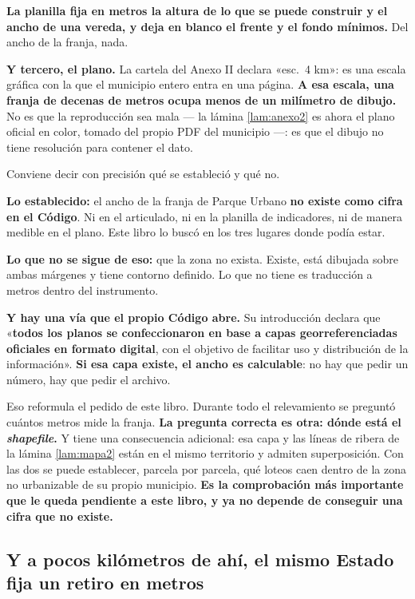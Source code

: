 \textbf{La planilla fija en metros la altura de lo que se puede construir y el ancho de una
vereda, y deja en blanco el frente y el fondo mínimos.} Del ancho de la franja, nada.

\textbf{Y tercero, el plano.} La cartela del Anexo II declara «esc.\ 4 km»: es una escala
gráfica con la que el municipio entero entra en una página. \textbf{A esa escala, una franja
de decenas de metros ocupa menos de un milímetro de dibujo.} No es que la reproducción sea
mala --- la lámina \ref{lam:anexo2} es ahora el plano oficial en color, tomado del propio PDF
del municipio ---: es que el dibujo no tiene resolución para contener el dato.

\begin{cautela}
Conviene decir con precisión qué se estableció y qué no.

\textbf{Lo establecido:} el ancho de la franja de Parque Urbano \textbf{no existe como cifra
en el Código}. Ni en el articulado, ni en la planilla de indicadores, ni de manera medible en
el plano. Este libro lo buscó en los tres lugares donde podía estar.

\textbf{Lo que no se sigue de eso:} que la zona no exista. Existe, está dibujada sobre ambas
márgenes y tiene contorno definido. Lo que no tiene es traducción a metros dentro del
instrumento.

\textbf{Y hay una vía que el propio Código abre.} Su introducción declara que «\textbf{todos
los planos se confeccionaron en base a capas georreferenciadas oficiales en formato digital},
con el objetivo de facilitar uso y distribución de la información». \textbf{Si esa capa
existe, el ancho es calculable}: no hay que pedir un número, hay que pedir el archivo.

Eso reformula el pedido de este libro. Durante todo el relevamiento se preguntó cuántos metros
mide la franja. \textbf{La pregunta correcta es otra: dónde está el \textit{shapefile}.} Y
tiene una consecuencia adicional: esa capa y las líneas de ribera de la lámina
\ref{lam:mapa2} están en el mismo territorio y admiten superposición. Con las dos se puede
establecer, parcela por parcela, qué loteos caen dentro de la zona no urbanizable de su propio
municipio. \textbf{Es la comprobación más importante que le queda pendiente a este libro, y ya
no depende de conseguir una cifra que no existe.}
\end{cautela}

\subsection*{Y a pocos kilómetros de ahí, el mismo Estado fija un retiro en metros}


